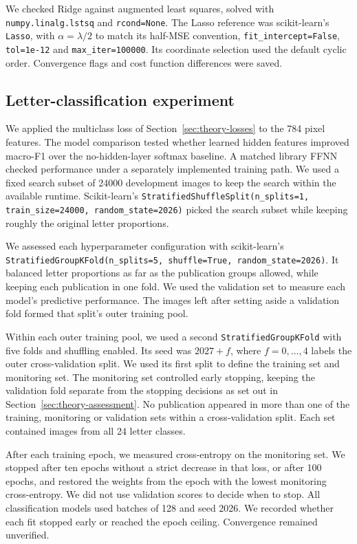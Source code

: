 We checked Ridge against augmented least squares, solved with
\nolinkurl{numpy.linalg.lstsq} and \nolinkurl{rcond=None}. The Lasso reference
was scikit-learn's \nolinkurl{Lasso}, with $\alpha=\lambda/2$ to match its
half-MSE convention, \nolinkurl{fit_intercept=False},
\nolinkurl{tol=1e-12} and \nolinkurl{max_iter=100000}. Its coordinate selection
used the default cyclic order. Convergence flags and cost function differences
were saved.

\subsection{Letter-classification experiment}
We applied the multiclass loss of Section~\ref{sec:theory-losses} to the
784 pixel features. The model comparison tested whether learned hidden
features improved macro-F1 over the no-hidden-layer softmax baseline.
A matched library FFNN checked performance under a separately implemented
training path. We used a fixed search subset of 24000 development images to keep the search
within the available runtime. Scikit-learn's
\nolinkurl{StratifiedShuffleSplit(n_splits=1, train_size=24000, random_state=2026)}
picked the search subset while keeping roughly the original letter proportions.

We assessed each hyperparameter configuration with scikit-learn's
\nolinkurl{StratifiedGroupKFold(n_splits=5, shuffle=True, random_state=2026)}.
It balanced letter proportions as far as the publication groups allowed,
while keeping each publication in one fold. We used the validation set to measure each model's predictive
performance. The images left after setting aside a validation fold formed
that split's outer training pool.

Within each outer training pool, we used a second
\nolinkurl{StratifiedGroupKFold} with five folds and shuffling enabled.
Its seed was $2027+f$, where $f=0,\ldots,4$ labels the outer
cross-validation split. We used
its first split to define the training set and monitoring set. The monitoring set controlled early stopping, keeping the validation
fold separate from the stopping decisions as set out in
Section~\ref{sec:theory-assessment}. No publication appeared in more than one of the training, monitoring or
validation sets within a cross-validation split. Each set contained images
from all 24 letter classes.

After each training epoch, we measured cross-entropy on the monitoring
set. We stopped after ten epochs without a strict decrease in that loss,
or after 100 epochs, and restored the weights from the epoch with the
lowest monitoring cross-entropy. We did not use validation scores to decide
when to stop. All classification models used batches of 128 and seed 2026.
We recorded whether each fit stopped early or reached the epoch ceiling.
Convergence remained unverified.

